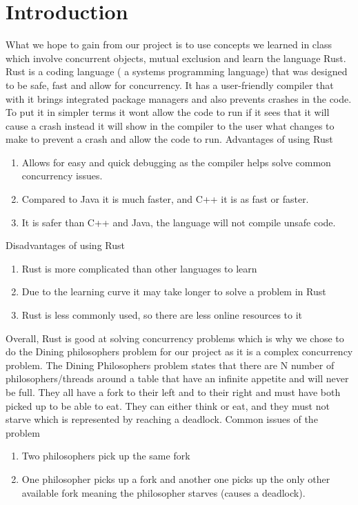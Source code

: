 \documentclass[conference]{IEEEtran}
\begin{document}
	\section{Introduction}
	 What we hope to gain from our project is to use concepts we learned in class which involve concurrent objects, mutual exclusion and learn the language Rust. Rust is a coding language ( a systems programming language) that was designed to be safe, fast and allow for concurrency.  It has a user-friendly compiler that with it brings integrated package managers and also prevents crashes in the code. To put it in simpler terms it wont allow the code to run if it sees that it will cause a crash instead it will show in the compiler to the user what changes to make to prevent a crash and allow the code to run.
      \linebreak
	 \linebreak
	 Advantages of using Rust
	 \begin{enumerate}
	 	\item Allows for easy and quick debugging as the compiler helps solve common concurrency issues.
	 	\item Compared to Java it is much faster, and C++ it is as fast or faster.
	 	\item It is safer than C++ and Java, the language will not compile unsafe code.
	 \end{enumerate}
	 Disadvantages of using Rust
	 \begin{enumerate}
	 	\item Rust is more complicated than other languages to learn
	 	\item Due to the learning curve it may take longer to solve a problem in Rust
	 	\item Rust is less commonly used, so there are less online resources to it
	\end{enumerate}
	Overall, Rust is good at solving concurrency problems which is why we chose to do the Dining philosophers problem for our project as it is a complex concurrency problem. The Dining Philosophers problem states that there are N number of philosophers/threads around a table that have an infinite appetite and will never be full. They all have a fork to their left and to their right and must have both picked up to be able to eat. They can either think or eat, and they must not starve which is represented by reaching a deadlock.
	 \linebreak
      \linebreak
	 Common issues of the problem
	 \begin{enumerate}
	 	\item Two philosophers pick up the same fork
	 	\item One philosopher picks up a fork and another one picks up the only other available fork meaning the philosopher starves (causes a deadlock).
	 \end{enumerate}
\end{document}
